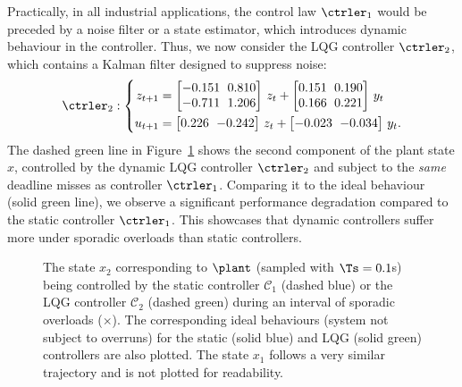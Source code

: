 \begin{example}
    Practically, in all industrial applications, the control law $\ctrler_1$ would be preceded by a noise filter or a state estimator, which introduces dynamic behaviour in the controller. 
    Thus, we now consider the LQG controller $\ctrler_2$, which contains a Kalman filter designed to suppress noise: 
    \begin{equation*}
        {\setlength\arraycolsep{3pt}
        \ctrler_2 : \left\{
        \begin{aligned}
            z_{t+1} &=
            \begin{bmatrix}
                -0.151 & 0.810 \\
                -0.711 & 1.206
            \end{bmatrix}\,z_t + 
            \begin{bmatrix}
                0.151 & 0.190 \\
                0.166 & 0.221
            \end{bmatrix}\,y_t \\
            u_{t+1} &=
            \begin{bmatrix}
                0.226 & -0.242
            \end{bmatrix}\,z_{t} +
            \begin{bmatrix}
                -0.023 & -0.034
            \end{bmatrix}\,y_t .
            \end{aligned}
        \right.}
    \end{equation*}
    The dashed green line in Figure~\ref{fig:lqr-lqg} shows the second component of the plant state $x$, controlled by the dynamic LQG controller $\ctrler_2$ and subject to the \emph{same} deadline misses as controller $\ctrler_1$.
    Comparing it to the ideal behaviour (solid green line), we observe a significant performance degradation compared to the static controller $\ctrler_1$.
    This showcases that dynamic controllers suffer more under sporadic overloads than static controllers.
\end{example}

\begin{figure}[t]
    \centerline{}
    \caption{The state $x_2$ corresponding to $\plant$ (sampled with $\Ts=0.1$s) being controlled by the static controller $\mathcal{C}_1$ (dashed blue) or the LQG controller $\mathcal{C}_2$ (dashed green) during an interval of sporadic overloads ($\times$).
        The corresponding ideal behaviours (system not subject to overruns) for the static (solid blue) and LQG (solid green) controllers are also plotted.
        The state $x_1$ follows a very similar trajectory and is not plotted for readability.}
    \label{fig:lqr-lqg}
\end{figure}

